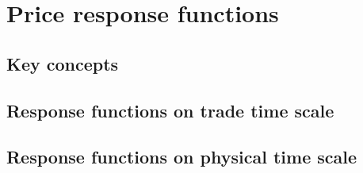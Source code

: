 \section{Price response functions}
\label{sec:response_functions}


\subsection{Key concepts}\label{subsec:key_concepts}

\subsection{Response functions on trade time scale}
\label{subsec:response_function_trade}


\subsection{Response functions on physical time scale}
\label{subsec:response_function_physical}
